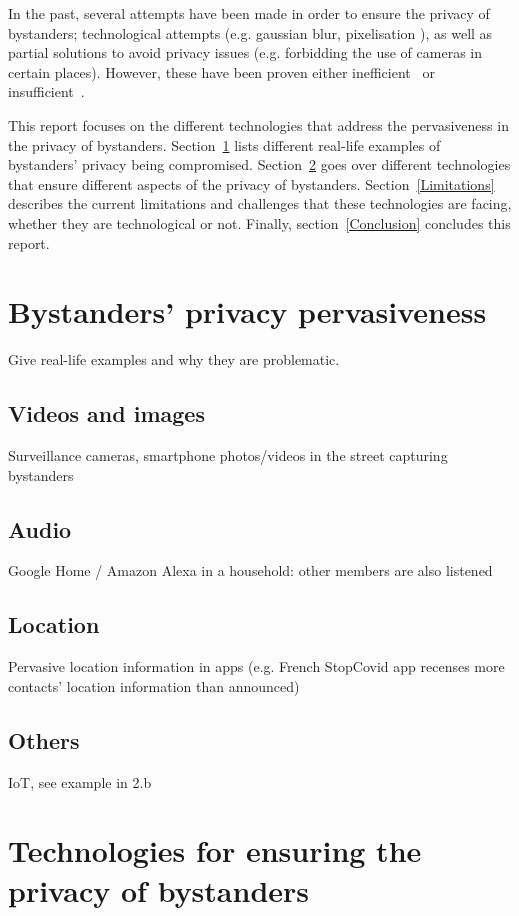 \documentclass[conference]{IEEEtran}
\begin{document}
In the past, several attempts have been made in order to ensure the privacy of bystanders; technological attempts (e.g. gaussian blur, pixelisation \cite{dufaux2010framework}), as well as partial solutions to avoid privacy issues (e.g. forbidding the use of cameras in certain places\cite{shu2016cardea}). However, these have been proven either inefficient~\cite{dufaux2010framework} or insufficient~\cite{shu2016cardea}. 

This report focuses on the different technologies that address the pervasiveness in the privacy of bystanders. Section~\ref{BystandersPrivacy} lists different real-life examples of bystanders' privacy being compromised. Section~\ref{Technologies} goes over different technologies that ensure different aspects of the privacy of bystanders. Section~\ref{Limitations} describes the current limitations and challenges that these technologies are facing, whether they are technological or not. Finally, section~\ref{Conclusion} concludes this report.

\section{Bystanders’ privacy pervasiveness}\label{BystandersPrivacy}
Give real-life examples and why they are problematic.
\subsection{Videos and images}
Surveillance cameras, smartphone photos/videos in the street capturing bystanders
\subsection{Audio}
Google Home / Amazon Alexa in a household: other members are also listened
\subsection{Location}
Pervasive location information in apps (e.g. French StopCovid app recenses more contacts’ location information than announced)
\subsection{Others}
IoT, see example in 2.b

\section{Technologies for ensuring the privacy of bystanders}\label{Technologies}
\end{document}
